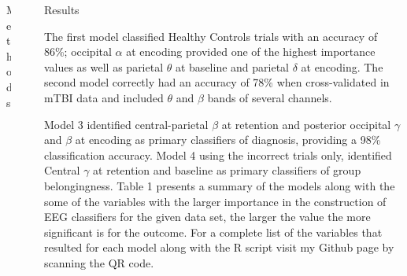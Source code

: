 \documentclass[final]{beamer}
\newlength{\sepwidth}
\newlength{\colwidth}
\newcommand{\separatorcolumn}{\begin{column}{\sepwidth}\end{column}}
\begin{document}
\begin{frame}[t]
\begin{columns}[t]
\begin{column}{\colwidth}
\begin{block}{Methods}
  \end{block}

\end{column}

\separatorcolumn

\begin{column}{\colwidth}

  \begin{block}{Results}

The first model classified Healthy Controls trials with an accuracy of 86\%; occipital $\alpha$ at encoding provided one of the highest importance values as well as parietal $\theta$ at baseline and parietal $\delta$ at encoding. The second model correctly had an accuracy of 78\% when cross-validated in mTBI data and included $\theta$ and $\beta$ bands of several channels.

Model 3 identified central-parietal $\beta$ at retention and posterior occipital $\gamma$ and $\beta$ at encoding as primary classifiers of diagnosis, providing a 98\% classification accuracy. Model 4 using the incorrect trials only, identified Central $\gamma$ at retention and baseline as primary classifiers of group belongingness. Table 1 presents a summary of the models along with the some of the variables with the larger importance in the construction of EEG classifiers for the given data set, the larger the value the more significant is for the outcome. For a complete list of the variables that resulted for each model along with the R script visit my Github page by scanning the QR code.


\end{block}
\end{column}
\end{columns}
\end{frame}
\end{document}
